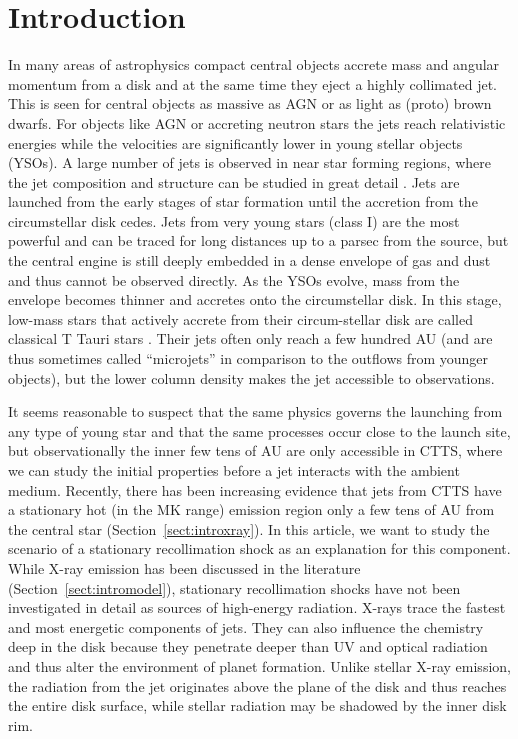 \section{Introduction} 
In many areas of astrophysics compact central objects accrete mass and angular momentum from a disk and at the same time they eject a highly collimated jet. This is seen for central objects as massive as AGN or as light as (proto) brown dwarfs. For objects like AGN or accreting neutron stars the jets reach relativistic energies while the velocities are significantly lower in young stellar objects (YSOs). 
A large number of jets is observed in near star forming regions, where the jet composition and structure can be studied in great detail \citep[see the review by][]{2014arXiv1402.3553F}.
Jets are launched from the early stages of star formation until the accretion from the circumstellar disk cedes. Jets from very young stars (class I) are the most powerful and can be traced for long distances up to a parsec from the source, but the central engine is still deeply embedded in a dense envelope of gas and dust and thus cannot be observed directly. As the YSOs evolve, mass from the envelope becomes thinner and accretes onto the circumstellar disk. In this stage, low-mass stars that actively accrete from their circum-stellar disk are called classical T Tauri stars \citep[for a review see][]{2013AN....334...67G}. Their jets often only reach a few hundred AU (and are thus sometimes called ``microjets'' in comparison to the outflows from younger objects), but the lower column density makes the jet accessible to observations.

It seems reasonable to suspect that the same physics governs the launching from any type of young star and that the same processes occur close to the launch site, but observationally the inner few tens of AU are only accessible in CTTS, where we can study the initial properties before a jet interacts with the ambient medium. Recently, there has been increasing evidence that jets from CTTS have a stationary hot (in the MK range) emission region only a few tens of AU from the central star (Section~\ref{sect:introxray}). In this article, we want to study the scenario of a stationary recollimation shock as an explanation for this component. While X-ray emission has been discussed in the literature (Section~\ref{sect:intromodel}), stationary recollimation shocks have not been investigated in detail as sources of high-energy radiation. X-rays trace the fastest and most energetic components of jets. They can also influence the chemistry deep in the disk \citep[e.g.][]{2010ApJ...714.1511H,2012ApJ...756..157G} because they penetrate deeper than UV and optical radiation and thus alter the environment of planet formation. Unlike stellar X-ray emission, the radiation from the jet originates above the plane of the disk and thus reaches the entire disk surface, while stellar radiation may be shadowed by the inner disk rim.

